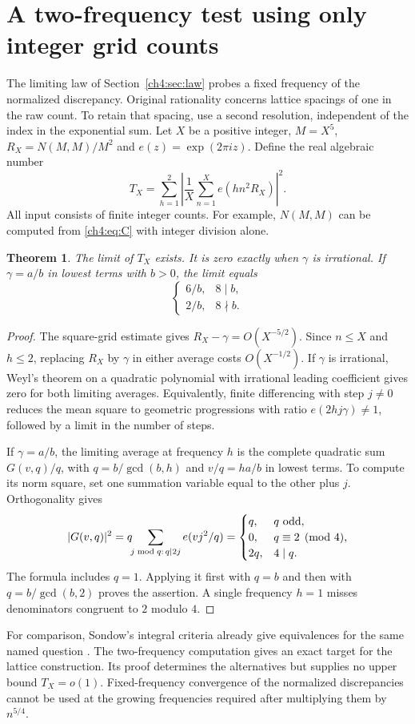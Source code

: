 \documentclass[11pt,a4paper,oneside,openany]{report}
\newtheorem{theorem}{Theorem}[section]
\theoremstyle{remark}\newtheorem{remark}[theorem]{Remark}
\numberwithin{equation}{section}
\begin{document}
\section{A two-frequency test using only integer grid counts}\label{ch4:sec:test}
The limiting law of Section~\ref{ch4:sec:law} probes a fixed frequency of the normalized discrepancy. Original rationality concerns lattice spacings of one in the raw count. To retain that spacing, use a second resolution, independent of the index in the exponential sum. Let $X$ be a positive integer, $M=X^5$, $R_X=N(M,M)/M^2$ and $e(z)=\exp(2\pi iz)$. Define the real algebraic number
\[
 T_X=\sum_{h=1}^{2}\left|\frac1X\sum_{n=1}^X e(hn^2 R_X)\right|^2.
\]
All input consists of finite integer counts. For example, $N(M,M)$ can be computed from \eqref{ch4:eq:C} with integer division alone.
\begin{theorem}\label{ch4:th:test}
The limit of $T_X$ exists. It is zero exactly when $\gamma$ is irrational. If $\gamma=a/b$ in lowest terms with $b>0$, the limit equals
\[
 \begin{cases}
  6/b,&8\mid b,\\
  2/b,&8\nmid b.
 \end{cases}
\]
\end{theorem}
\begin{proof}
The square-grid estimate gives $R_X-\gamma=O(X^{-5/2})$. Since $n\le X$ and $h\le2$, replacing $R_X$ by $\gamma$ in either average costs $O(X^{-1/2})$. If $\gamma$ is irrational, Weyl's theorem on a quadratic polynomial with irrational leading coefficient gives zero for both limiting averages. Equivalently, finite differencing with step $j\ne0$ reduces the mean square to geometric progressions with ratio $e(2hj\gamma)\ne1$, followed by a limit in the number of steps.

If $\gamma=a/b$, the limiting average at frequency $h$ is the complete quadratic sum $G(v,q)/q$, with $q=b/\gcd(b,h)$ and $v/q=ha/b$ in lowest terms. To compute its norm square, set one summation variable equal to the other plus $j$. Orthogonality gives
\[
 |G(v,q)|^2=q\!\!\sum_{j\bmod q:\,q\mid2j}e(vj^2/q)
 =\begin{cases}q,&q\ {\rm odd},\\0,&q\equiv2\pmod4,\\2q,&4\mid q.\end{cases}
\]
The formula includes $q=1$. Applying it first with $q=b$ and then with $q=b/\gcd(b,2)$ proves the assertion. A single frequency $h=1$ misses denominators congruent to $2$ modulo $4$.
\end{proof}
For comparison, Sondow's integral criteria already give equivalences for the same named question \cite{sondow}. The two-frequency computation gives an exact target for the lattice construction. Its proof determines the alternatives but supplies no upper bound $T_X=o(1)$. Fixed-frequency convergence of the normalized discrepancies cannot be used at the growing frequencies required after multiplying them by $n^{5/4}$.
\end{document}
